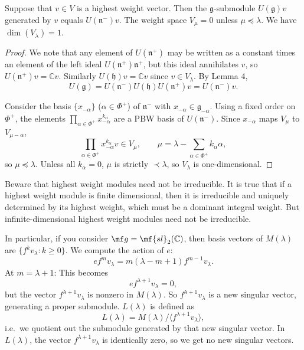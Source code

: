 \documentclass[12pt]{article}
\begin{document}
\begin{proposition}
    Suppose that $v \in V$ is a highest weight vector. Then the $\mathfrak{g}$-submodule $U(\mathfrak{g})v$ generated by $v$ equals $U(\mathfrak{n}^-)v$. The weight space $V_\mu = 0$ unless $\mu \preceq \lambda$. We have $\dim(V_\lambda) = 1$.
\end{proposition}

\begin{proof}
    We note that any element of $U(\mathfrak{n}^+)$ may be written as a constant times an element of the left ideal $U(\mathfrak{n}^+)\mathfrak{n}^+$, but this ideal annihilates $v$, so $U(\mathfrak{n}^+)v = \mathbb{C}v$. Similarly $U(\mathfrak{h})v = \mathbb{C}v$ since $v \in V_\lambda$. By Lemma 4,
    \[
        U(\mathfrak{g}) = U(\mathfrak{n}^-)U(\mathfrak{h})U(\mathfrak{n}^+)v = U(\mathfrak{n}^-)v.
    \]

    Consider the basis $\{x_{-\alpha}\}$ ($\alpha \in \Phi^+$) of $\mathfrak{n}^-$ with $x_{-\alpha} \in \mathfrak{g}_{-\alpha}$. Using a fixed order on $\Phi^+$, the elements $\prod_{\alpha \in \Phi^+} x_{-\alpha}^{k_\alpha}$ are a PBW basis of $U(\mathfrak{n}^-)$. Since $x_{-\alpha}$ maps $V_\mu$ to $V_{\mu-\alpha}$,
    \[
        \prod_{\alpha \in \Phi^+} x_{-\alpha}^{k_\alpha} v \in V_\mu,
        \qquad \mu = \lambda - \sum_{\alpha \in \Phi^+} k_\alpha \alpha,
    \]
    so $\mu \preceq \lambda$. Unless all $k_\alpha = 0$, $\mu$ is strictly $\prec \lambda$, so $V_\lambda$ is one-dimensional.
\end{proof}

\begin{remark}
    Beware that highest weight modules need not be irreducible. It is true that if a highest weight module is finite dimensional, then it is irreducible and uniquely determined by its highest weight, which must be a dominant integral weight. But infinite-dimensional highest weight modules need not be irreducible.
    

    In particular, if you consider $\mf g  = \mf{sl}_2(\mathbb{C})$, then basis vectors of $M(\lambda)$ are $\{ f^k v_\lambda : k \ge 0 \}$. We compute the action of $e$:
    \[
        e f^m v_\lambda = m (\lambda - m + 1) f^{m-1} v_\lambda.
    \]
    At $m = \lambda+1$:
    This becomes
    \[
        e f^{\lambda+1} v_\lambda = 0,
    \]
    but the vector $f^{\lambda+1} v_\lambda$ is nonzero in $M(\lambda)$.
    So $f^{\lambda+1} v_\lambda$ is a new singular vector, generating a proper submodule. $L(\lambda)$ is defined as
    \[
        L(\lambda) = M(\lambda) \big/ \langle f^{\lambda+1} v_\lambda \rangle,
    \]
    i.e.\ we quotient out the submodule generated by that new singular vector. In $L(\lambda)$, the vector $f^{\lambda+1} v_\lambda$ is identically zero, so we get no new singular vectors.
\end{remark}
\end{document}
